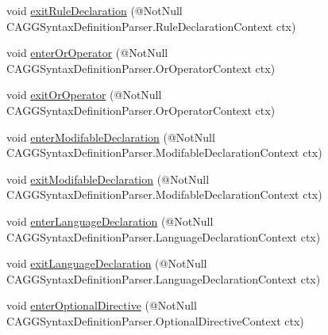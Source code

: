 \begin{DoxyCompactItemize}
\item 
void \hyperlink{interfaceit_1_1emarolab_1_1cagg_1_1core_1_1language_1_1parser_1_1ANTLRInterface_1_1ANTLRGenerate8f089aac366bd2683be460c907cc6185_a9f1875376b4e2c1d057bfffb92e865b8}{exit\-Rule\-Declaration} (@Not\-Null C\-A\-G\-G\-Syntax\-Definition\-Parser.\-Rule\-Declaration\-Context ctx)
\item 
void \hyperlink{interfaceit_1_1emarolab_1_1cagg_1_1core_1_1language_1_1parser_1_1ANTLRInterface_1_1ANTLRGenerate8f089aac366bd2683be460c907cc6185_a5265b744553698285d8a17f02fb2645f}{enter\-Or\-Operator} (@Not\-Null C\-A\-G\-G\-Syntax\-Definition\-Parser.\-Or\-Operator\-Context ctx)
\item 
void \hyperlink{interfaceit_1_1emarolab_1_1cagg_1_1core_1_1language_1_1parser_1_1ANTLRInterface_1_1ANTLRGenerate8f089aac366bd2683be460c907cc6185_a45e37c91184d65f3f81228fd4c341e7b}{exit\-Or\-Operator} (@Not\-Null C\-A\-G\-G\-Syntax\-Definition\-Parser.\-Or\-Operator\-Context ctx)
\item 
void \hyperlink{interfaceit_1_1emarolab_1_1cagg_1_1core_1_1language_1_1parser_1_1ANTLRInterface_1_1ANTLRGenerate8f089aac366bd2683be460c907cc6185_a19d458321bc3617a070aebe5057cb6d7}{enter\-Modifable\-Declaration} (@Not\-Null C\-A\-G\-G\-Syntax\-Definition\-Parser.\-Modifable\-Declaration\-Context ctx)
\item 
void \hyperlink{interfaceit_1_1emarolab_1_1cagg_1_1core_1_1language_1_1parser_1_1ANTLRInterface_1_1ANTLRGenerate8f089aac366bd2683be460c907cc6185_ad7ab7ae6be937d0039226caad415348e}{exit\-Modifable\-Declaration} (@Not\-Null C\-A\-G\-G\-Syntax\-Definition\-Parser.\-Modifable\-Declaration\-Context ctx)
\item 
void \hyperlink{interfaceit_1_1emarolab_1_1cagg_1_1core_1_1language_1_1parser_1_1ANTLRInterface_1_1ANTLRGenerate8f089aac366bd2683be460c907cc6185_abfbd68e25da54adec84a6a59eb3da711}{enter\-Language\-Declaration} (@Not\-Null C\-A\-G\-G\-Syntax\-Definition\-Parser.\-Language\-Declaration\-Context ctx)
\item 
void \hyperlink{interfaceit_1_1emarolab_1_1cagg_1_1core_1_1language_1_1parser_1_1ANTLRInterface_1_1ANTLRGenerate8f089aac366bd2683be460c907cc6185_af89680df9e46ff6eeda5d4f826e39fc9}{exit\-Language\-Declaration} (@Not\-Null C\-A\-G\-G\-Syntax\-Definition\-Parser.\-Language\-Declaration\-Context ctx)
\item 
void \hyperlink{interfaceit_1_1emarolab_1_1cagg_1_1core_1_1language_1_1parser_1_1ANTLRInterface_1_1ANTLRGenerate8f089aac366bd2683be460c907cc6185_aba578efdcde318876225d85b9baea63f}{enter\-Optional\-Directive} (@Not\-Null C\-A\-G\-G\-Syntax\-Definition\-Parser.\-Optional\-Directive\-Context ctx)

\end{DoxyCompactItemize}
